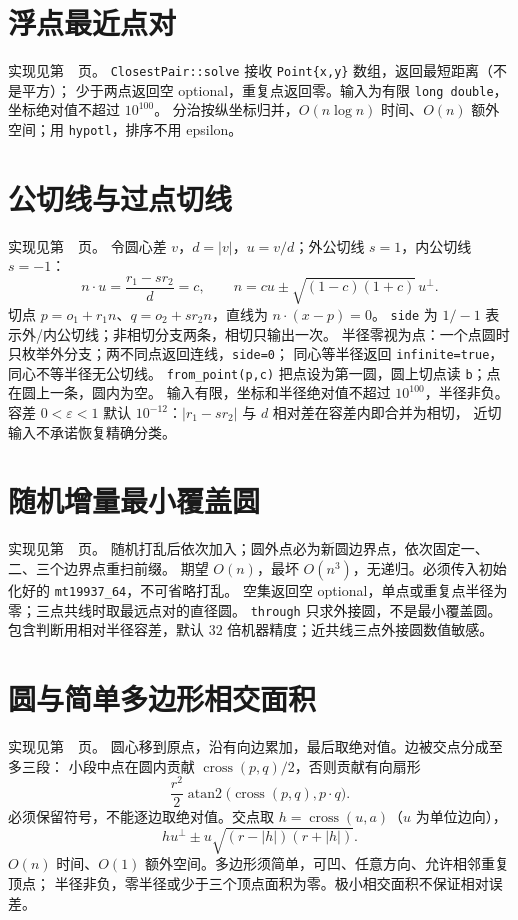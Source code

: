 \section{浮点最近点对}
实现见第~\pageref{compact-ClosestPair}~页。
\texttt{ClosestPair::solve} 接收 \texttt{Point\{x,y\}} 数组，返回最短距离（不是平方）；
少于两点返回空 optional，重复点返回零。输入为有限 \texttt{long double}，坐标绝对值不超过 $10^{100}$。
分治按纵坐标归并，$O(n\log n)$ 时间、$O(n)$ 额外空间；用 \texttt{hypotl}，排序不用 epsilon。

\section{公切线与过点切线}
实现见第~\pageref{compact-CircleTangents}~页。
令圆心差 $v$，$d=|v|$，$u=v/d$；外公切线 $s=1$，内公切线 $s=-1$：
\[
 n\cdot u=\frac{r_1-sr_2}{d}=c,
 \qquad n=cu\pm\sqrt{(1-c)(1+c)}\,u^\perp.
\]
切点 $p=o_1+r_1n$、$q=o_2+sr_2n$，直线为 $n\cdot(x-p)=0$。
\texttt{side} 为 $1/-1$ 表示外/内公切线；非相切分支两条，相切只输出一次。
半径零视为点：一个点圆时只枚举外分支；两不同点返回连线，\texttt{side=0}；
同心等半径返回 \texttt{infinite=true}，同心不等半径无公切线。
\texttt{from\_point(p,c)} 把点设为第一圆，圆上切点读 \texttt{b}；点在圆上一条，圆内为空。
输入有限，坐标和半径绝对值不超过 $10^{100}$，半径非负。
容差 $0<\varepsilon<1$ 默认 $10^{-12}$：$|r_1-sr_2|$ 与 $d$ 相对差在容差内即合并为相切，
近切输入不承诺恢复精确分类。

\section{随机增量最小覆盖圆}
实现见第~\pageref{compact-EnclosingCircle}~页。
随机打乱后依次加入；圆外点必为新圆边界点，依次固定一、二、三个边界点重扫前缀。
期望 $O(n)$，最坏 $O(n^3)$，无递归。必须传入初始化好的 \texttt{mt19937\_64}，不可省略打乱。
空集返回空 optional，单点或重复点半径为零；三点共线时取最远点对的直径圆。
\texttt{through} 只求外接圆，不是最小覆盖圆。
包含判断用相对半径容差，默认 $32$ 倍机器精度；近共线三点外接圆数值敏感。

\section{圆与简单多边形相交面积}
实现见第~\pageref{compact-CirclePolygon}~页。
圆心移到原点，沿有向边累加，最后取绝对值。边被交点分成至多三段：
小段中点在圆内贡献 $\operatorname{cross}(p,q)/2$，否则贡献有向扇形
\[
\frac{r^2}{2}\operatorname{atan2}\bigl(\operatorname{cross}(p,q),p\cdot q\bigr).
\]
必须保留符号，不能逐边取绝对值。交点取 $h=\operatorname{cross}(u,a)$（$u$ 为单位边向），
\[
hu^\perp\pm u\sqrt{(r-|h|)(r+|h|)}.
\]
$O(n)$ 时间、$O(1)$ 额外空间。多边形须简单，可凹、任意方向、允许相邻重复顶点；
半径非负，零半径或少于三个顶点面积为零。极小相交面积不保证相对误差。

